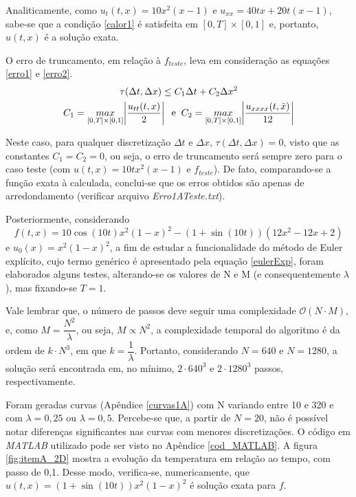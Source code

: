 \documentclass[12pt]{article}
\begin{document}
\begin{spacing}{1.5}
Analiticamente, como $u_{t}(t,x)=10x^{2}(x-1)$ e $u_{xx}=40tx+20t(x - 1)$, sabe-se que a condição \eqref{calor1} é satisfeita em $[0,T]\times[0,1]$ e, portanto, $u(t,x)$ é a solução exata.

O erro de truncamento, em relação à $f_{teste}$, leva em consideração as equações \eqref{erro1} e \eqref{erro2}.
\begin{gather}
\tau(\Delta t,\Delta x) \leq C_{1}\Delta t + C_{2}\Delta x^{2} \label{erro1}\\
C_{1}= \underset{[0,T]\times[0,1]}{max}\abs{\frac{u_{tt}(t,x)}{2}}\;\;\text{e}\;\;C_{2}=\underset{[0,T]\times[0,1]}{max}\abs{\frac{u_{xxxx}(t,\bar{x})}{12}} \label{erro2}
\end{gather}

Neste caso, para qualquer discretização $\Delta t$ e $\Delta x$, $\tau(\Delta t,\Delta x)=0$, visto que as constantes $C_{1} = C_{2} = 0$, ou seja, o erro de truncamento será sempre zero para o caso teste (com $u(t,x)=10tx^{2}(x-1)$ e $f_{teste}$). De fato, comparando-se a função exata à calculada, conclui-se que os erros obtidos são apenas de arredondamento (verificar arquivo \textit{Erro1ATeste.txt}).

Posteriormente, considerando $$f(t,x)=10\cos(10t)x^{2}(1-x)^{2}-(1+\sin(10t))(12x^{2}-12x+2)$$ e $u_{0}(x)=x^{2}(1-x)^{2}$, a fim de estudar a funcionalidade do método de Euler explícito, cujo termo genérico é apresentado pela equação \eqref{eulerExp}, foram elaborados alguns testes, alterando-se os valores de N e M (e consequentemente $\lambda$), mas fixando-se $T = 1$.

Vale lembrar que, o número de passos deve seguir uma complexidade $\mathcal{O}(N{\cdot} M)$, e, como $M =\dfrac{N^2}{\lambda}$, ou seja, $M\propto N^{2}$, a complexidade temporal do algoritmo é da ordem de $k{\cdot}N^{3}$, em que $k = \dfrac{1}{\lambda}$. Portanto, considerando $N=640$ e $N=1280$, a solução será encontrada em, no mínimo, $2\cdot 640^{3}$ e $2\cdot 1280^{3}$ passos, respectivamente.

Foram geradas curvas (Apêndice \ref{curvas1A}) com N variando entre 10 e 320 e com $\lambda=0,25$ ou $\lambda=0,5$. Percebe-se que, a partir de $N=20$, não é possível notar diferenças significantes nas curvas com menores discretizações. O código em \textit{MATLAB} utilizado pode ser visto no Apêndice \ref{cod_MATLAB}. A figura \ref{fig:itemA_2D} mostra a evolução da temperatura em relação ao tempo, com passo de 0,1. Desse modo, verifica-se, numericamente, que $u(t,x)=(1 +\sin(10t))x^{2}(1-x)^{2}$ é solução exata para $f$.


\end{spacing}
\end{document}
